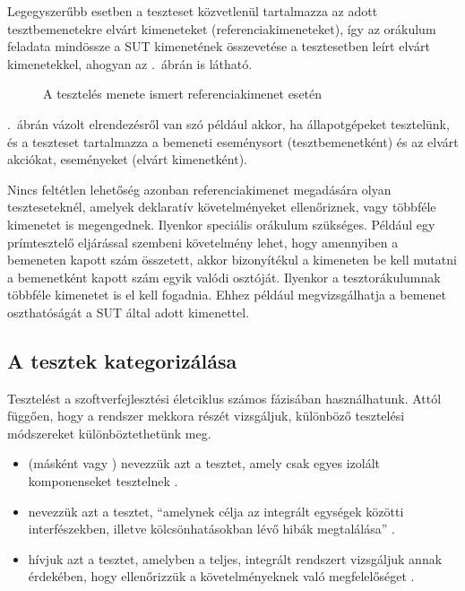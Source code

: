 Legegyszerűbb esetben a teszteset közvetlenül tartalmazza az adott tesztbemenetekre elvárt kimeneteket (referenciakimeneteket), így az orákulum feladata mindössze a SUT kimenetének összevetése a tesztesetben leírt elvárt kimenetekkel, ahogyan az .~ábrán is látható.

\begin{figure}[h]
	\centering
	
	
	\caption{A tesztelés menete ismert referenciakimenet esetén}
	\label{fig:teszteles-elrendezes-elvart-kimenet}
\end{figure}

.~ábrán vázolt elrendezésről van szó például akkor, ha állapotgépeket tesztelünk, és a teszteset tartalmazza a bemeneti eseménysort (tesztbemenetként) és az elvárt akciókat, eseményeket (elvárt kimenetként). 

Nincs feltétlen lehetőség azonban referenciakimenet megadására olyan teszteseteknél, amelyek deklaratív követelményeket ellenőriznek, vagy többféle kimenetet is megengednek. Ilyenkor speciális orákulum szükséges. Például egy prímtesztelő eljárással szembeni követelmény lehet, hogy amennyiben a bemeneten kapott szám összetett, akkor bizonyítékul a kimeneten be kell mutatni a bemenetként kapott szám egyik valódi osztóját. Ilyenkor a tesztorákulumnak többféle kimenetet is el kell fogadnia. Ehhez például megvizsgálhatja a bemenet oszthatóságát a SUT által adott kimenettel.


\subsection{A tesztek kategorizálása\kiegeszitoanyag}
Tesztelést a szoftverfejlesztési életciklus számos fázisában használhatunk. Attól függően, hogy a rendszer mekkora részét vizsgáljuk, különböző tesztelési módszereket különböztethetünk meg.

\begin{itemize}
\item {} (másként  vagy ) nevezzük azt a tesztet, amely csak egyes izolált komponenseket tesztelnek \cite{HTB-glossary}.
\item {} nevezzük azt a tesztet, ``amelynek célja az integrált egységek közötti
interfészekben, illetve kölcsönhatásokban lévő hibák megtalálása''  \cite{HTB-glossary}.
\item {} hívjuk azt a tesztet, amelyben a teljes, integrált rendszert vizsgáljuk annak érdekében, hogy ellenőrizzük a követelményeknek való megfelelőséget \cite{HTB-glossary}.
\end{itemize}

